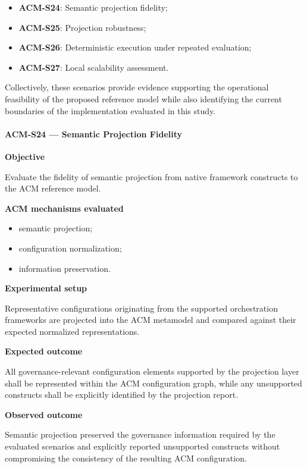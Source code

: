 \documentclass[10pt]{article}
\begin{document}
\begin{itemize}
    \item \textbf{ACM-S24}: Semantic projection fidelity;
    \item \textbf{ACM-S25}: Projection robustness;
    \item \textbf{ACM-S26}: Deterministic execution under repeated evaluation;
    \item \textbf{ACM-S27}: Local scalability assessment.
\end{itemize}

Collectively, these scenarios provide evidence supporting the operational
feasibility of the proposed reference model while also identifying the current
boundaries of the implementation evaluated in this study.

\paragraph{ACM-S24 --- Semantic Projection Fidelity}

\textbf{Objective}

Evaluate the fidelity of semantic projection from native framework constructs
to the ACM reference model.

\textbf{ACM mechanisms evaluated}

\begin{itemize}
    \item semantic projection;
    \item configuration normalization;
    \item information preservation.
\end{itemize}

\textbf{Experimental setup}

Representative configurations originating from the supported orchestration
frameworks are projected into the ACM metamodel and compared against their
expected normalized representations.

\textbf{Expected outcome}

All governance-relevant configuration elements supported by the projection
layer shall be represented within the ACM configuration graph, while any
unsupported constructs shall be explicitly identified by the projection report.

\textbf{Observed outcome}

Semantic projection preserved the governance information required by the
evaluated scenarios and explicitly reported unsupported constructs without
compromising the consistency of the resulting ACM configuration.
\end{document}
